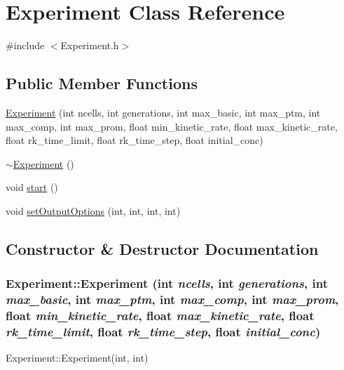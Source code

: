 \hypertarget{classExperiment}{
\section{Experiment Class Reference}
\label{classExperiment}
}


{\ttfamily \#include $<$Experiment.h$>$}\subsection*{Public Member Functions}
\begin{DoxyCompactItemize}
\item 
\hyperlink{classExperiment_a600bd431197ce5df6c62f6647c561f7b}{Experiment} (int ncells, int generations, int max\_\-basic, int max\_\-ptm, int max\_\-comp, int max\_\-prom, float min\_\-kinetic\_\-rate, float max\_\-kinetic\_\-rate, float rk\_\-time\_\-limit, float rk\_\-time\_\-step, float initial\_\-conc)
\item 
\hyperlink{classExperiment_a96058d848040e45948bbb60623711da6}{$\sim$Experiment} ()
\item 
void \hyperlink{classExperiment_ab15fca04be9b7bcad65b264b23b4a499}{start} ()
\item 
void \hyperlink{classExperiment_a7597c63f9fe2f8dede62dbe79202bf61}{setOutputOptions} (int, int, int, int)
\end{DoxyCompactItemize}


\subsection{Constructor \& Destructor Documentation}
\hypertarget{classExperiment_a600bd431197ce5df6c62f6647c561f7b}{
\subsubsection[{Experiment}]{\setlength{\rightskip}{0pt plus 5cm}Experiment::Experiment (int {\em ncells}, \/  int {\em generations}, \/  int {\em max\_\-basic}, \/  int {\em max\_\-ptm}, \/  int {\em max\_\-comp}, \/  int {\em max\_\-prom}, \/  float {\em min\_\-kinetic\_\-rate}, \/  float {\em max\_\-kinetic\_\-rate}, \/  float {\em rk\_\-time\_\-limit}, \/  float {\em rk\_\-time\_\-step}, \/  float {\em initial\_\-conc})}}
\label{classExperiment_a600bd431197ce5df6c62f6647c561f7b}
Experiment::Experiment(int, int)

